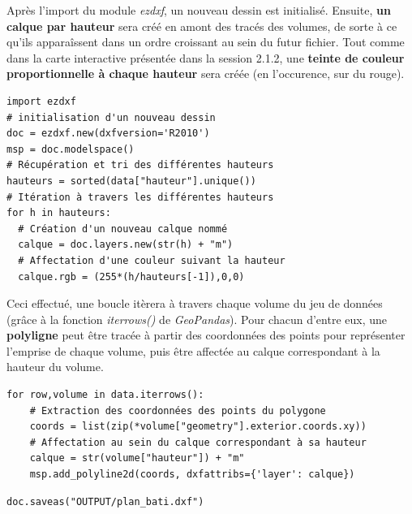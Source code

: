 \documentclass[
  11pt,
  french,
]{article}
\begin{document}
Après l'import du module \emph{ezdxf}, un nouveau dessin est initialisé.
Ensuite, \textbf{un calque par hauteur} sera créé en amont des tracés
des volumes, de sorte à ce qu'ils apparaîssent dans un ordre croissant
au sein du futur fichier. Tout comme dans la carte interactive présentée
dans la session 2.1.2, une \textbf{teinte de couleur proportionnelle à
chaque hauteur} sera créée (en l'occurence, sur du rouge).

\begin{tcolorbox}[title= Carte des volumes par hauteur avec de l'interactivité ,colback=boitecode]
\begin{lstlisting}[style=code]
import ezdxf
# initialisation d'un nouveau dessin
doc = ezdxf.new(dxfversion='R2010')
msp = doc.modelspace()
# Récupération et tri des différentes hauteurs
hauteurs = sorted(data["hauteur"].unique())
# Itération à travers les différentes hauteurs
for h in hauteurs:
  # Création d'un nouveau calque nommé
  calque = doc.layers.new(str(h) + "m")
  # Affectation d'une couleur suivant la hauteur
  calque.rgb = (255*(h/hauteurs[-1]),0,0)\end{lstlisting}
\end{tcolorbox}

Ceci effectué, une boucle itèrera à travers chaque volume du jeu de
données (grâce à la fonction \emph{iterrows()} de \emph{GeoPandas}).
Pour chacun d'entre eux, une \textbf{polyligne} peut être tracée à
partir des coordonnées des points pour représenter l'emprise de chaque
volume, puis être affectée au calque correspondant à la hauteur du
volume.

\begin{tcolorbox}[title= Carte des volumes par hauteur avec de l'interactivité ,colback=boitecode]
\begin{lstlisting}[style=code]
for row,volume in data.iterrows():
    # Extraction des coordonnées des points du polygone
    coords = list(zip(*volume["geometry"].exterior.coords.xy))
    # Affectation au sein du calque correspondant à sa hauteur
    calque = str(volume["hauteur"]) + "m"
    msp.add_polyline2d(coords, dxfattribs={'layer': calque})\end{lstlisting}
\begin{lstlisting}[style=code]
doc.saveas("OUTPUT/plan_bati.dxf")\end{lstlisting}
\end{tcolorbox}
\end{document}
